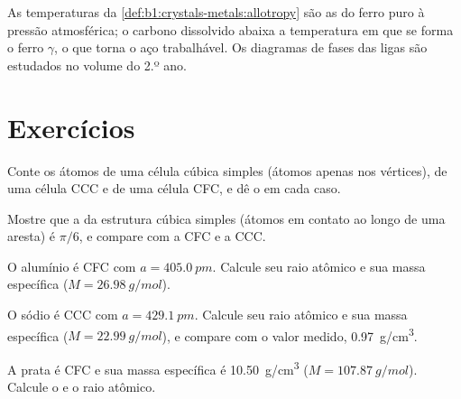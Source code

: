 \begin{remark}\label{rem:b1:crystals-metals:iron-T}
As temperaturas da \cref{def:b1:crystals-metals:allotropy} são as do
ferro puro à pressão atmosférica; o carbono dissolvido abaixa a
temperatura em que se forma o ferro $\gamma$, o que torna o aço
trabalhável. Os diagramas de fases das ligas são estudados no volume do
2.º ano.
\end{remark}

\section{Exercícios}

\begin{exercise}[$\star$]\label{exo:b1:crystals-metals:1}
Conte os átomos de uma célula cúbica simples (átomos apenas nos
vértices), de uma célula CCC e de uma célula CFC, e dê o  em cada caso.
\end{exercise}

\begin{exercise}[$\star$]\label{exo:b1:crystals-metals:2}
Mostre que a  da estrutura cúbica simples (átomos em contato
ao longo de uma aresta) é $\pi/6$, e compare com a CFC e a CCC.
\end{exercise}

\begin{exercise}[$\star$]\label{exo:b1:crystals-metals:3}
O alumínio é CFC com $a = \qty{405.0}{pm}$. Calcule seu raio atômico e
sua massa específica ($M = \qty{26.98}{g/mol}$).
\end{exercise}

\begin{exercise}[$\star$]\label{exo:b1:crystals-metals:4}
O sódio é CCC com $a = \qty{429.1}{pm}$. Calcule seu raio atômico e
sua massa específica ($M = \qty{22.99}{g/mol}$), e compare com o valor
medido, \qty{0.97}{g/cm^3}.
\end{exercise}

\begin{exercise}[$\star\star$]\label{exo:b1:crystals-metals:5}
A prata é CFC e sua massa específica é \qty{10.50}{g/cm^3}
($M = \qty{107.87}{g/mol}$). Calcule o  e o raio
atômico.
\end{exercise}

